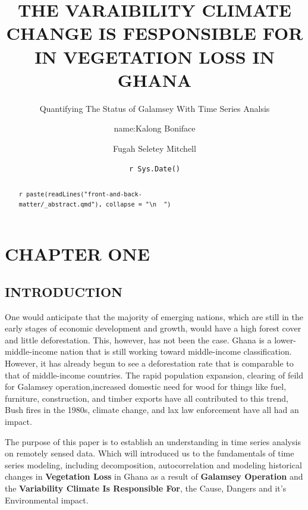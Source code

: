 \documentclass[
  onepage,
  openany]{scrbook}
\title{THE VARAIBILITY CLIMATE CHANGE IS FESPONSIBLE FOR IN VEGETATION
LOSS IN GHANA}
\subtitle{Quantifying The Status of Galamsey With Time Series Analsis}
\author{name:Kalong Boniface \and Fugah Seletey Mitchell}
\date{\texttt{r\ Sys.Date()}}
\renewcommand*\contentsname{Table of contents}
\newcommand\contentsname{Table of contents}
\begin{document}
\frontmatter
\maketitle
\begin{abstract}
\texttt{r\ paste(readLines("front-and-back-matter/\_abstract.qmd"),\ collapse\ =\ "\textbackslash{}n\ \ ")}
\end{abstract}
\ifdefined\Shaded\renewenvironment{Shaded}{\begin{tcolorbox}[boxrule=0pt, breakable, colback={shadecolor}, enhanced, frame hidden]}{\end{tcolorbox}}\fi

\renewcommand*\contentsname{Table of Contents}
{
\hypersetup{linkcolor=}
\setcounter{tocdepth}{2}
\tableofcontents
}
\listoffigures
\listoftables
\mainmatter
\hypertarget{chapter-one}{%
\chapter{CHAPTER ONE}\label{chapter-one}}

\hypertarget{introduction}{%
\section{INTRODUCTION}\label{introduction}}

One would anticipate that the majority of emerging nations, which are
still in the early stages of economic development and growth, would have
a high forest cover and little deforestation. This, however, has not
been the case. Ghana is a lower-middle-income nation that is still
working toward middle-income classification. However, it has already
begun to see a deforestation rate that is comparable to that of
middle-income countries. The rapid population expansion, clearing of
feild for Galamsey operation,increased domestic need for wood for things
like fuel, furniture, construction, and timber exports have all
contributed to this trend, Bush fires in the 1980s, climate change, and
lax law enforcement have all had an impact.

The purpose of this paper is to establish an understanding in time
series analysis on remotely sensed data. Which will introduced us to the
fundamentals of time series modeling, including decomposition,
autocorrelation and modeling historical changes in \textbf{Vegetation
Loss} in Ghana as a result of \textbf{Galamsey Operation} and the
\textbf{Variability Climate Is Responsible For}, the Cause, Dangers and
it's Environmental impact.
\end{document}
